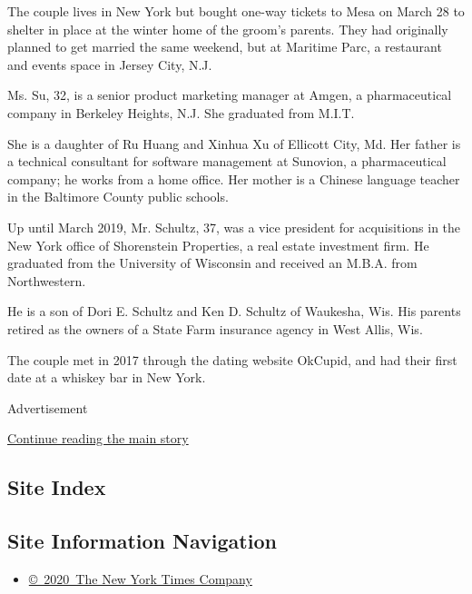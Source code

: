 The couple lives in New York but bought one-way tickets to Mesa on March
28 to shelter in place at the winter home of the groom's parents. They
had originally planned to get married the same weekend, but at Maritime
Parc, a restaurant and events space in Jersey City, N.J.

Ms. Su, 32, is a senior product marketing manager at Amgen, a
pharmaceutical company in Berkeley Heights, N.J. She graduated from
M.I.T.

She is a daughter of Ru Huang and Xinhua Xu of Ellicott City, Md. Her
father is a technical consultant for software management at Sunovion, a
pharmaceutical company; he works from a home office. Her mother is a
Chinese language teacher in the Baltimore County public schools.

Up until March 2019, Mr. Schultz, 37, was a vice president for
acquisitions in the New York office of Shorenstein Properties, a real
estate investment firm. He graduated from the University of Wisconsin
and received an M.B.A. from Northwestern.

He is a son of Dori E. Schultz and Ken D. Schultz of Waukesha, Wis. His
parents retired as the owners of a State Farm insurance agency in West
Allis, Wis.

The couple met in 2017 through the dating website OkCupid, and had their
first date at a whiskey bar in New York.

Advertisement

\protect\hyperlink{after-bottom}{Continue reading the main story}

\hypertarget{site-index}{%
\subsection{Site Index}\label{site-index}}

\hypertarget{site-information-navigation}{%
\subsection{Site Information
Navigation}\label{site-information-navigation}}

\begin{itemize}
\tightlist
\item
  \href{https://help.nytimes.com/hc/en-us/articles/115014792127-Copyright-notice}{©~2020~The
  New York Times Company}
\end{itemize}

